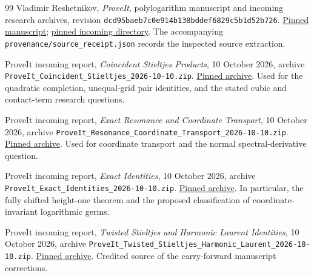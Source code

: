 \documentclass[11pt,a4paper]{article}
\theoremstyle{definition}
\theoremstyle{remark}
\numberwithin{equation}{section}
\begin{document}
\begin{thebibliography}{99}
Vladimir Reshetnikov, \emph{ProveIt}, polylogarithm manuscript and
incoming research archives, revision
\texttt{dcd95baeb7c0e914b138bddef6829c5b1d52b726}.
\href{https://github.com/VladimirReshetnikov/ProveIt/tree/dcd95baeb7c0e914b138bddef6829c5b1d52b726/Analysis/Polylogarithms/docs/manuscript}{Pinned manuscript};
\href{https://github.com/VladimirReshetnikov/ProveIt/tree/dcd95baeb7c0e914b138bddef6829c5b1d52b726/docs/incoming}{pinned incoming directory}.
The accompanying \texttt{provenance/source\_receipt.json} records the
inspected source extraction.

ProveIt incoming report, \emph{Coincident Stieltjes Products},
10 October 2026, archive
\texttt{ProveIt\_Coincident\_Stieltjes\_2026-10-10.zip}.
\href{https://github.com/VladimirReshetnikov/ProveIt/blob/dcd95baeb7c0e914b138bddef6829c5b1d52b726/docs/incoming/ProveIt_Coincident_Stieltjes_2026-10-10.zip}{Pinned archive}.
Used for the quadratic completion, unequal-grid pair identities, and
the stated cubic and contact-term research questions.

ProveIt incoming report, \emph{Exact Resonance and Coordinate
Transport}, 10 October 2026, archive
\texttt{ProveIt\_Resonance\_Coordinate\_Transport\_2026-10-10.zip}.
\href{https://github.com/VladimirReshetnikov/ProveIt/blob/dcd95baeb7c0e914b138bddef6829c5b1d52b726/docs/incoming/ProveIt_Resonance_Coordinate_Transport_2026-10-10.zip}{Pinned archive}.
Used for coordinate transport and the normal spectral-derivative
question.

ProveIt incoming report, \emph{Exact Identities}, 10 October 2026,
archive \texttt{ProveIt\_Exact\_Identities\_2026-10-10.zip}.
\href{https://github.com/VladimirReshetnikov/ProveIt/blob/dcd95baeb7c0e914b138bddef6829c5b1d52b726/docs/incoming/ProveIt_Exact_Identities_2026-10-10.zip}{Pinned archive}.
In particular, the fully shifted height-one theorem and the proposed
classification of coordinate-invariant logarithmic germs.

ProveIt incoming report, \emph{Twisted Stieltjes and Harmonic Laurent
Identities}, 10 October 2026, archive
\texttt{ProveIt\_Twisted\_Stieltjes\_Harmonic\_Laurent\_2026-10-10.zip}.
\href{https://github.com/VladimirReshetnikov/ProveIt/blob/dcd95baeb7c0e914b138bddef6829c5b1d52b726/docs/incoming/ProveIt_Twisted_Stieltjes_Harmonic_Laurent_2026-10-10.zip}{Pinned archive}.
Credited source of the carry-forward manuscript corrections.


\end{thebibliography}
\end{document}
